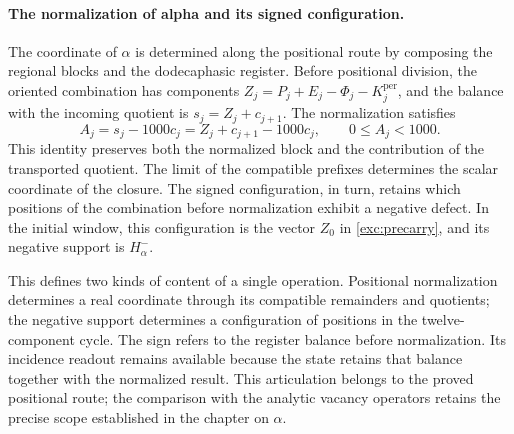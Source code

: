 \paragraph{The normalization of alpha and its signed configuration.}
\label{inc-ampl-clausura}
The coordinate of $\alpha$ is determined along the positional route by
composing the regional blocks and the dodecaphasic register. Before
positional division, the oriented combination has components
$Z_j=P_j+E_j-\Phi_j-K_j^{\mathrm{per}}$, and the balance with the incoming quotient
is $s_j=Z_j+c_{j+1}$. The normalization satisfies
\begin{equation}
 A_j=s_j-1000c_j=Z_j+c_{j+1}-1000c_j,\qquad 0\leq A_j<1000.
 \label{inc-ampl-normalizacion}
\end{equation}
This identity preserves both the normalized block and the
contribution of the transported quotient. The limit of the compatible
prefixes determines the scalar coordinate of the closure. The signed
configuration, in turn, retains which positions of the combination
before normalization exhibit a negative defect.
In the initial window, this configuration is the vector $Z_0$ in
\eqref{exc:precarry}, and its negative support is $H^-_\alpha$.

This defines two kinds of content of a single operation. Positional
normalization determines a real coordinate through its compatible
remainders and quotients; the negative support determines a
configuration of positions in the twelve-component cycle. The sign
refers to the register balance before normalization. Its incidence
readout remains available because the state retains that balance
together with the normalized result. This articulation belongs to the
proved positional route; the comparison with the analytic vacancy
operators retains the precise scope established in the chapter on
$\alpha$.
